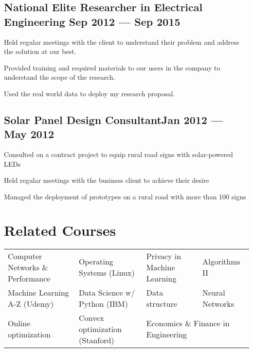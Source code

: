 \documentclass[letter,11pt]{article}
\begin{document}
\subsection{National Elite Researcher in Electrical Engineering \hfill Sep 2012 --- Sep 2015}
\begin{zitemize}
	\item Held regular meetings with the client to understand their problem and address the solution at our best.
	\item Provided training and required materials to our users in the company to understand the scope of the research.
	\item Used the real world  data to deploy my research proposal.
\end{zitemize}


\subsection{Solar Panel Design Consultant\hfill Jan 2012 --- May 2012}
\begin{zitemize}
	\item Consulted on a contract project to equip rural road signs with solar-powered LEDs
	\item Held regular meetings with the business client to achieve their desire
	\item Managed the deployment of prototypes on a rural road with more than 100 signs
\end{zitemize}







\section{Related Courses}
\begin{tabular}{p{5.9cm}p{5.3cm}p{5cm}p{5cm}}
	Computer Networks \& Performance & Operating Systems (Linux) & Privacy in Machine Learning & Algorithms II\\
	Machine Learning A-Z (Udemy) & Data Science w/ Python (IBM) & Data structure & Neural Networks \\
	Online optimization & Convex optimization (Stanford) & \multicolumn{2}{l}{Economics \& Finance in Engineering}\\
\end{tabular}
\end{document}
